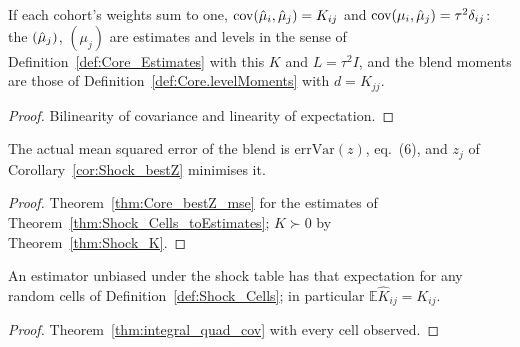 \begin{theorem}\label{thm:Shock_Cells_toEstimates}
  \leanok
  If each cohort's weights sum to one, $\operatorname{cov}(\hat\mu_i,\hat\mu_j) = K_{ij}$ and
  $\operatorname{cov}(\mu_i,\hat\mu_j) = \tau^2\delta_{ij}$: the $(\hat\mu_j)$, $(\mu_j)$ are estimates and levels
  in the sense of Definition~\ref{def:Core_Estimates} with this $K$ and $L = \tau^2 I$, and
  the blend moments are those of Definition~\ref{def:Core.levelMoments} with $d = K_{jj}$.
\end{theorem}
\begin{proof}
  \leanok
  Bilinearity of covariance and linearity of expectation.
\end{proof}

\begin{theorem}\label{thm:Shock_Cells_bestZ_mse}
  \leanok
  The actual mean squared error of the blend is $\mathrm{errVar}(z)$, eq.~(6), and
  $z_j$ of Corollary~\ref{cor:Shock_bestZ} minimises it.
\end{theorem}
\begin{proof}
  \leanok
  Theorem~\ref{thm:Core_bestZ_mse} for the estimates of
  Theorem~\ref{thm:Shock_Cells_toEstimates}; $K \succ 0$ by Theorem~\ref{thm:Shock_K}.
\end{proof}

\begin{theorem}\label{thm:Shock_Cells_integral}
  \leanok
  An estimator unbiased under the shock table has that expectation for any random cells of
  Definition~\ref{def:Shock_Cells}; in particular $\mathbb E\hat K_{ij} = K_{ij}$.
\end{theorem}
\begin{proof}
  \leanok
  Theorem~\ref{thm:integral_quad_cov} with every cell observed.
\end{proof}
